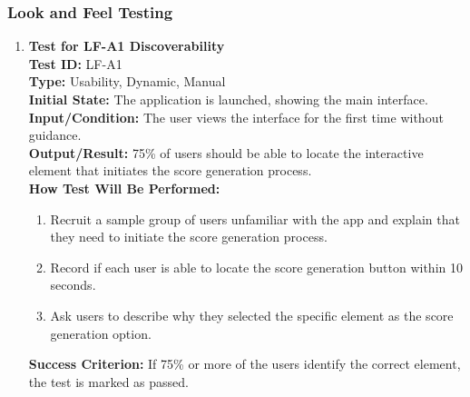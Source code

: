 \documentclass[12pt, titlepage]{article}
\begin{document}
\subsubsection{Look and Feel Testing}
\begin{enumerate}
    \item \textbf{Test for LF-A1 Discoverability} \\
      \newline
      \textbf{Test ID:} LF-A1 \\
      \textbf{Type:} Usability, Dynamic, Manual \\
      \textbf{Initial State:} The application is launched, showing the main interface. \\
      \textbf{Input/Condition:} The user views the interface for the first time without guidance. \\
      \textbf{Output/Result:} 75\% of users should be able to locate the interactive element that initiates the score generation process. \\
      \textbf{How Test Will Be Performed:}
      \begin{enumerate}
          \item Recruit a sample group of users unfamiliar with the app and explain that they need to initiate the score generation process.
          \item Record if each user is able to locate the score generation button within 10 seconds.
          \item Ask users to describe why they selected the specific element as the score generation option.
      \end{enumerate}
      \textbf{Success Criterion:} If 75\% or more of the users identify the correct element, the test is marked as passed.


\end{enumerate}
\end{document}
